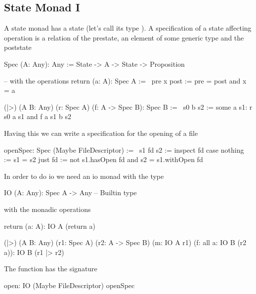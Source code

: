 \subsection {State Monad I}

A state monad has a state (let's call its type ). A specification of
a state affecting operation is a relation of the prestate, an element of some
generic type and the poststate
%
\begin{alba}
    Spec (A: Any): Any :=
        State -> A -> State -> Proposition

    -- with the operations
    return (a: A): Spec A :=
        \ pre x post :=
            pre = post and x = a

    (|>) (A B: Any) (r: Spec A) (f: A -> Spec B): Spec B :=
        \ s0 b s2 :=
            some a s1:
                r s0 a s1
                and f a s1 b s2
\end{alba}

Having this we can write a specification for the opening of a file

\begin{alba}
    openSpec: Spec (Maybe FileDescriptor) :=
        \ s1 fd s2 :=
            inspect fd case
                nothing :=
                    s1 = s2
                just fd :=
                    not s1.hasOpen fd
                    and
                    s2 = s1.withOpen fd
\end{alba}

In order to do io we need an io monad with the type
\begin{alba}
    IO (A: Any): Spec A -> Any  -- Builtin type
\end{alba}
%
with the monadic operations
\begin{alba}
    return (a: A): IO A (return a)

    (|>)
        (A B: Any)
        (r1: Spec A)
        (r2: A -> Spec B)
        (m: IO A r1)
        (f: all a: IO B (r2 a)):
        IO B (r1 |> r2)
\end{alba}




The  function has the signature
%
\begin{alba}
    open: IO (Maybe FileDescriptor) openSpec
\end{alba}



\begin{alba}
\end{alba}






